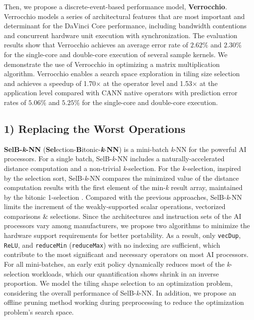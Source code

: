 \documentclass[12pt]{extbook}
\begin{document}
Then, we propose a discrete-event-based performance model, \textbf{Verrocchio}. Verrocchio models a series of architectural features that are most important and determinant for the DaVinci Core performance, including bandwidth contentions and concurrent hardware unit execution with synchronization. The evaluation results show that Verrocchio achieves an average error rate of $2.62\%$ and $2.30\%$ for the single-core and double-core execution of several sample kernels. We demonstrate the use of Verrocchio in optimizing a matrix multiplication algorithm. Verrocchio enables a search space exploration in tiling size selection and achieves a speedup of 1.70$\times$ at the operator level and 1.53$\times$ at the application level compared with CANN \cite{CANN} native operators with prediction error rates of $5.06\%$ and $5.25\%$ for the single-core and double-core execution.

\subsection{1) Replacing the Worst Operations}

\textbf{SelB-\textit{k}-NN} (\textbf{Sel}ection-\textbf{B}itonic-\textbf{\textit{k}}-\textbf{NN}) is a mini-batch \textit{k}-NN for the powerful AI processors. For a single batch, SelB-\textit{k}-NN includes a naturally-accelerated distance computation and a non-trivial \textit{k}-selection. For the \textit{k}-selection, inspired by the selection sort, SelB-\textit{k}-NN compares the minimized value of the distance computation results with the first element of the min-\textit{k} result array, maintained by the bitonic 1-selection \cite{DBLP:conf/sigmod/ShanbhagPM18}. Compared with the previous approaches, SelB-\textit{k}-NN limits the increment of the weakly-supported scalar operations, vectorized comparisons \& selections. Since the architectures and instruction sets of the AI processors vary among manufacturers, we propose two algorithms to minimize the hardware support requirements for better portability. As a result, only \verb|vecDup|, \verb|ReLU|, and \verb|reduceMin| (\verb|reduceMax|) with no indexing are sufficient, which contribute to the most significant and necessary operators on most AI processors. For all mini-batches, an early exit policy dynamically reduces most of the \textit{k}-selection workloads, which our quantification shows shrink in an inverse proportion. We model the tiling shape selection to an optimization problem, considering the overall performance of SelB-\textit{k}-NN. In addition, we propose an offline pruning method working during preprocessing to reduce the optimization problem's search space.
\end{document}
